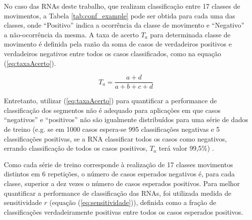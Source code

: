 \begin{table}[htb]
\end{table}

No caso das RNAs deste trabalho, que realizam classificação entre 17 classes de movimentos, a Tabela \ref{tab:conf_example} pode ser obtida para cada uma das classes, onde ``Positivo'' indica a ocorrência da classe de movimento e ``Negativo'' a não-ocorrência da mesma. A taxa de acerto $T_a$ para determinada classe de movimento é definida pela razão da soma de casos de verdadeiros positivos e verdadeiros negativos entre todos os casos classificados, como na equação (\ref{eq:taxaAcerto}).

\begin{equation}
\label{eq:taxaAcerto}
	T_a = \frac{a+d}{a+b+c+d}
\end{equation}

Entretanto, utilizar (\ref{eq:taxaAcerto}) para quantificar a performance de classificação dos segmentos não é adequado para aplicações em que casos ``negativos'' e ``positivos'' não são igualmente distribuídos para uma série de dados de treino (e.g. se em 1000 casos espera-se 995 classificações negativas e 5 classificações positivas, se a RNA classificar todos os casos como negativos, errando classificação de todos os casos positivos, $T_a$ terá valor 99,5\%) \cite{Kubat1998}.

Como cada série de treino corresponde à realização de 17 classes movimentos distintos em 6 repetições, o número de casos esperados negativos é, para cada classe, superior a dez vezes o número de casos esperados positivos. Para melhor quantificar a performance de classificação das RNAs, foi utilizada medida de sensitividade $r$ (equação (\ref{eq:sensitividade})), definida como a fração de classificações verdadeiramente positivas entre todos os casos esperados positivos.

